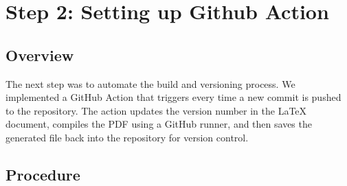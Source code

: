 \section{Step 2: Setting up Github Action}

\subsection{Overview}
The next step was to automate the build and versioning process. We implemented a GitHub Action that triggers every time a new commit is pushed to the repository. The action updates the version number in the LaTeX document, compiles the PDF using a GitHub runner, and then saves the generated file back into the repository for version control.

\subsection{Procedure}
